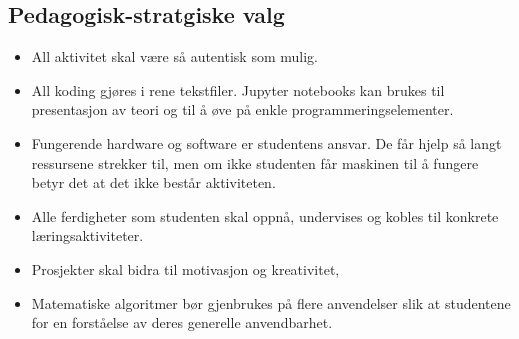 \subsection{Pedagogisk-stratgiske valg}

\begin{itemize}
	\item All aktivitet skal være så autentisk som mulig.
	\item All koding gjøres i rene tekstfiler. Jupyter notebooks kan brukes til presentasjon av teori og til å øve på enkle programmeringselementer.
	\item Fungerende hardware og software er studentens ansvar. De får hjelp så langt ressursene strekker til, men om ikke studenten får maskinen til å fungere betyr det at det ikke består aktiviteten.
	\item Alle ferdigheter som studenten skal oppnå, undervises og kobles til konkrete læringsaktiviteter.
	\item Prosjekter skal bidra til motivasjon og kreativitet,
	\item Matematiske algoritmer bør gjenbrukes på flere anvendelser slik at studentene for en forståelse av deres generelle anvendbarhet.
\end{itemize}
